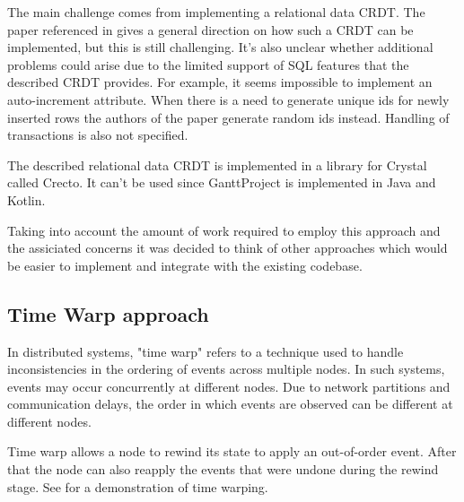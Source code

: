 \documentclass[a4paper, 11pt, oneside]{article}
\theoremstyle{definition}
\begin{document}
The main challenge comes from implementing a relational data CRDT. The paper referenced in  gives a general direction on how such a CRDT can be implemented, but this is still challenging. It's also unclear whether additional problems could arise due to the limited support of SQL features that the described CRDT provides. For example, it seems impossible to implement an auto-increment attribute. When there is a need to generate unique ids for newly inserted rows the authors of the paper generate random ids instead. Handling of transactions is also not specified.

The described relational data CRDT is implemented in a library for Crystal called Crecto. It can't be used since GanttProject is implemented in Java and Kotlin. 

Taking into account the amount of work required to employ this approach and the assiciated concerns it was decided to think of other approaches which would be easier to implement and integrate with the existing codebase.


\subsection{Time Warp approach}

In distributed systems, "time warp" refers to a technique used to handle inconsistencies in the ordering of events across multiple nodes. In such systems, events may occur concurrently at different nodes. Due to network partitions and communication delays, the order in which events are observed can be different at different nodes.

Time warp allows a node to rewind its state to apply an out-of-order event. After that the node can also reapply the events that were undone during the rewind stage. See  for a demonstration of time warping.
\end{document}
